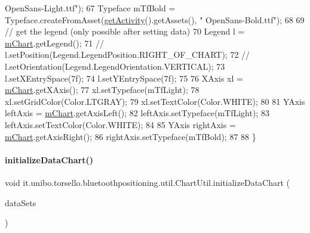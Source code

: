 \begin{DoxyCode}
{      OpenSans-Light.ttf"});
67         Typeface mTfBold = Typeface.createFromAsset(\hyperlink{classit_1_1unibo_1_1torsello_1_1bluetoothpositioning_1_1util_1_1ChartUtil_a59150a6d20b6d0ad2fcf8c1ba858d355_a59150a6d20b6d0ad2fcf8c1ba858d355}{getActivity}().getAssets(), \textcolor{stringliteral}{"
      OpenSans-Bold.ttf"});
68 
69         \textcolor{comment}{// get the legend (only possible after setting data)}
70         Legend l = \hyperlink{classit_1_1unibo_1_1torsello_1_1bluetoothpositioning_1_1util_1_1ChartUtil_a60b5bd6796cc5dcde12d9a6bb3e67c86_a60b5bd6796cc5dcde12d9a6bb3e67c86}{mChart}.getLegend();
71 \textcolor{comment}{//        l.setPosition(Legend.LegendPosition.RIGHT\_OF\_CHART);}
72 \textcolor{comment}{//        l.setOrientation(Legend.LegendOrientation.VERTICAL);}
73         l.setXEntrySpace(7f);
74         l.setYEntrySpace(7f);
75 
76         XAxis xl = \hyperlink{classit_1_1unibo_1_1torsello_1_1bluetoothpositioning_1_1util_1_1ChartUtil_a60b5bd6796cc5dcde12d9a6bb3e67c86_a60b5bd6796cc5dcde12d9a6bb3e67c86}{mChart}.getXAxis();
77         xl.setTypeface(mTfLight);
78         xl.setGridColor(Color.LTGRAY);
79         xl.setTextColor(Color.WHITE);
80 
81         YAxis leftAxis = \hyperlink{classit_1_1unibo_1_1torsello_1_1bluetoothpositioning_1_1util_1_1ChartUtil_a60b5bd6796cc5dcde12d9a6bb3e67c86_a60b5bd6796cc5dcde12d9a6bb3e67c86}{mChart}.getAxisLeft();
82         leftAxis.setTypeface(mTfLight);
83         leftAxis.setTextColor(Color.WHITE);
84 
85         YAxis rightAxis = \hyperlink{classit_1_1unibo_1_1torsello_1_1bluetoothpositioning_1_1util_1_1ChartUtil_a60b5bd6796cc5dcde12d9a6bb3e67c86_a60b5bd6796cc5dcde12d9a6bb3e67c86}{mChart}.getAxisRight();
86         rightAxis.setTypeface(mTfBold);
87 
88     \}
\end{DoxyCode}
\hypertarget{classit_1_1unibo_1_1torsello_1_1bluetoothpositioning_1_1util_1_1ChartUtil_a3393d9aa353849188c02a63d64f2dd2d_a3393d9aa353849188c02a63d64f2dd2d}{}\label{classit_1_1unibo_1_1torsello_1_1bluetoothpositioning_1_1util_1_1ChartUtil_a3393d9aa353849188c02a63d64f2dd2d_a3393d9aa353849188c02a63d64f2dd2d} 
\paragraph{\texorpdfstring{initialize\+Data\+Chart()}{initializeDataChart()}}
{\footnotesize\ttfamily void it.\+unibo.\+torsello.\+bluetoothpositioning.\+util.\+Chart\+Util.\+initialize\+Data\+Chart (\begin{DoxyParamCaption}\item[{Array\+List$<$ I\+Line\+Data\+Set $>$}]{data\+Sets }\end{DoxyParamCaption})\hspace{0.3cm}{\ttfamily [private]}}


